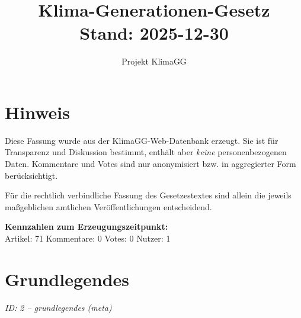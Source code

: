 \documentclass[12pt,a4paper]{scrartcl}
\title{Klima-Generationen-Gesetz\\\large Stand: 2025-12-30}
\author{Projekt KlimaGG}
\date{}  %
\begin{document}
\maketitle

\thispagestyle{scrheadings}

\tableofcontents
\newpage

\section*{Hinweis}
Diese Fassung wurde aus der KlimaGG-Web-Datenbank erzeugt. Sie ist
für Transparenz und Diskussion bestimmt, enthält aber \emph{keine}
personenbezogenen Daten. Kommentare und Votes sind nur anonymisiert bzw.
in aggregierter Form berücksichtigt.

Für die rechtlich verbindliche Fassung des Gesetzestextes sind allein
die jeweils maßgeblichen amtlichen Veröffentlichungen entscheidend.

\bigskip
\noindent
\textbf{Kennzahlen zum Erzeugungszeitpunkt:}\\
Artikel: 71 \quad Kommentare: 0 \quad Votes: 0 \quad Nutzer: 1

\bigskip



\section[Grundlegendes]{Grundlegendes}
\noindent\textit{ID: 2 -- grundlegendes (meta)}
\end{document}
